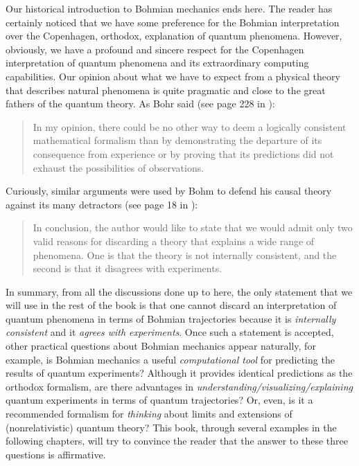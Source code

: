 \documentclass[onecolumn,nofootinbib, secnumarabic, amsmath, nobibnotes,12pt,aps,pra]{revtex4-1}
\begin{document}
Our historical introduction to Bohmian mechanics ends here. The
reader has certainly noticed that we have some preference for the
Bohmian interpretation over the Copenhagen, orthodox, explanation of
quantum phenomena. However, obviously, we have a profound and
sincere respect for the Copenhagen interpretation of quantum
phenomena and its extraordinary computing capabilities. Our opinion
about what we have to expect from a physical theory that describes
natural phenomena is quite pragmatic and close to the great fathers
of the quantum theory. As Bohr said (see page 228 in
\cite{om.bohr1949}):\\
\begin{quote}
In my opinion, there could be no other way to deem a logically consistent mathematical formalism than by demonstrating the departure of its consequence from experience or by proving that its predictions did not exhaust the possibilities of observations.\\
\end{quote}
Curiously, similar arguments were used by Bohm to defend his causal theory against its many detractors (see page 18 in \cite{om.Bohm1953b}):\\
\begin{quote}
In conclusion, the author would like to state that we would admit only two valid reasons for discarding a theory that explains a wide range of phenomena. One is that the theory is not internally consistent, and the second is that it disagrees with experiments.\\
\end{quote}\vspace*{-12pt}
In summary, from all the discussions done up to here, the only
statement that we will use in the rest of the book is that one
cannot discard an interpretation of quantum phenomena in terms of
Bohmian trajectories because it is \textit{internally consistent}
and it \textit{agrees with experiments}. Once such a statement is
accepted, other practical questions about Bohmian mechanics appear
naturally, for example, is Bohmian mechanics a useful
\textit{computational tool} for predicting the results of quantum experiments?
Although it provides identical predictions as the orthodox
formalism, are there advantages in
\textit{understanding/visualizing/explaining} quantum experiments in
terms of quantum trajectories? Or, even, is it a recommended
formalism for \textit{thinking} about limits and extensions of
(nonrelativistic) quantum theory? This book, through several
examples in the following chapters, will try to convince the reader
that the answer to these three questions is affirmative.
\end{document}
